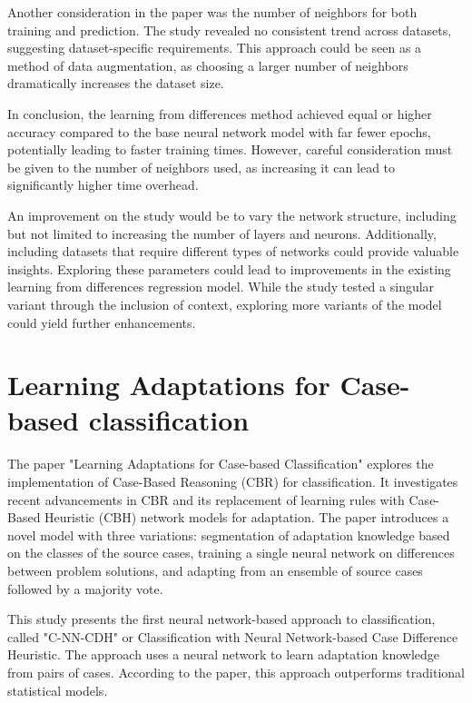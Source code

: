 \documentclass[a4paper, 12pt]{report}
\begin{document}
Another consideration in the paper \cite{learningFromDifferences2022} was the number of neighbors for both training and prediction. 
The study revealed no consistent trend across datasets, suggesting dataset-specific requirements. 
This approach could be seen as a method of data augmentation, as choosing a larger number of neighbors dramatically increases the dataset size.

In conclusion, the learning from differences method achieved equal or higher accuracy compared to the base neural network model with far fewer epochs, 
potentially leading to faster training times. However, careful consideration must be given to the number of neighbors used, as increasing it can lead to significantly higher time overhead.

An improvement on the study \cite{learningFromDifferences2022} would be to vary the network structure, including but not limited to increasing the number of layers and neurons. 
Additionally, including datasets that require different types of networks could provide valuable insights. 
Exploring these parameters could lead to improvements in the existing learning from differences regression model. 
While the study tested a singular variant through the inclusion of context, exploring more variants of the model could yield further enhancements.
\section{Learning Adaptations for Case-based classification}
The paper \cite{ye2021learning} "Learning Adaptations for Case-based Classification" explores the implementation of Case-Based Reasoning (CBR) for classification.
It investigates recent advancements in CBR and its replacement of learning rules with Case-Based Heuristic (CBH) network models for adaptation. 
The paper introduces a novel model with three variations: segmentation of adaptation knowledge based on the classes of the source cases, 
training a single neural network on differences between problem solutions, and adapting from an ensemble of source cases followed by a majority vote.

This study \cite{ye2021learning} presents the first neural network-based approach to classification, called "C-NN-CDH" or 
Classification with Neural Network-based Case Difference Heuristic. The approach uses a neural network to learn adaptation knowledge from pairs of cases. 
According to the paper, this approach outperforms traditional statistical models.
\end{document}
